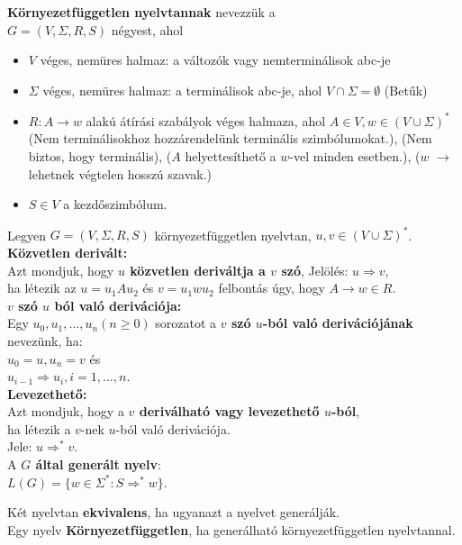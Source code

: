 \documentclass{beamer}
\newcommand{\mmedskip}{\vspace{0.5em}}
\begin{document}
\begin{frame}
\begin{tcolorbox}[title={Def.: Környezetfüggetlen nyelvtan}]
\textbf{Környezetfüggetlen nyelvtannak} nevezzük a\\
$G = (V, {\Sigma}, R, S)$ négyest, ahol\\
\begin{itemize}
\item $V$ véges, nemüres halmaz: a változók vagy nemterminálisok abc-je
\item $\Sigma$ véges, nemüres halmaz: a terminálisok abc-je, ahol $V \cap \Sigma = \emptyset$ (Betűk)
\item $R : A \rightarrow w$ alakú átírási szabályok véges halmaza, ahol $A \in V, w \in (V \cup {\Sigma})^*$\\
(Nem terminálisokhoz hozzárendelünk terminális szimbólumokat.), (Nem biztos, hogy terminális), ($A$ helyettesíthető a $w$-vel minden esetben.), ($w$ $\rightarrow$ lehetnek végtelen hosszú szavak.)
\item $S \in V$ a kezdőszimbólum.
\end{itemize}
\end{tcolorbox}

\begin{tcolorbox}[title={Def.: Deriváció, közvetlen derivált}]
Legyen $G = (V, {\Sigma}, R, S)$ környezetfüggetlen nyelvtan, $u, v \in (V \cup {\Sigma})^*$.\\
\mmedskip
\textbf{Közvetlen derivált:}\\
Azt mondjuk, hogy \textbf{$u$ közvetlen deriváltja a $v$ szó}, Jelölés: $u \Rightarrow v$,\\
ha létezik az $u = u_1Au_2$ és $v = u_1wu_2$ felbontás úgy, hogy $A  \rightarrow w \in R$.\\
\mmedskip
\textbf{$v$ szó $u$ ból való derivációja:}\\
Egy $u_0, u_1, ..., u_n (n \geq 0)$ sorozatot a \textbf{$v$ szó $u$-ból való derivációjának} nevezünk, ha:\\
$u_0 = u, u_n = v$ és\\
$u_{i - 1} \Rightarrow u_i, i = 1, ..., n$.\\
\mmedskip
\textbf{Levezethető:}\\
Azt mondjuk, hogy a \textbf{$v$ deriválható vagy levezethető $u$-ból},
\\ha létezik a $v$-nek $u$-ból való derivációja.\\
Jele: $u {\Rightarrow}^* v$.\\
\mmedskip
A \textbf{$G$ által generált nyelv}:\\
$L(G) = \{w \in {\Sigma}^* : S {\Rightarrow}^* w\}$.

\end{tcolorbox}

\begin{tcolorbox}[squeezed title={Def.: Nyelvtanok ekvivalenciája, Környezetfüggetlen nyelv}]
Két nyelvtan \textbf{ekvivalens}, ha ugyanazt a nyelvet generálják.\\
Egy nyelv \textbf{Környezetfüggetlen}, ha generálható környezetfüggetlen nyelvtannal.
\end{tcolorbox}

\end{frame}
\end{document}
